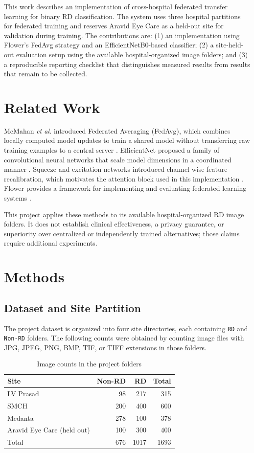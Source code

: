 \documentclass[conference]{IEEEtran}
\begin{document}
This work describes an implementation of cross-hospital federated transfer learning for binary RD classification. The system uses three hospital partitions for federated training and reserves Aravid Eye Care as a held-out site for validation during training. The contributions are: (1) an implementation using Flower's FedAvg strategy and an EfficientNetB0-based classifier; (2) a site-held-out evaluation setup using the available hospital-organized image folders; and (3) a reproducible reporting checklist that distinguishes measured results from results that remain to be collected.

\section{Related Work}
McMahan \emph{et al.} introduced Federated Averaging (FedAvg), which combines locally computed model updates to train a shared model without transferring raw training examples to a central server \cite{mcmahan2017}. EfficientNet proposed a family of convolutional neural networks that scale model dimensions in a coordinated manner \cite{tan2019}. Squeeze-and-excitation networks introduced channel-wise feature recalibration, which motivates the attention block used in this implementation \cite{hu2018}. Flower provides a framework for implementing and evaluating federated learning systems \cite{beutel2020}.

This project applies these methods to its available hospital-organized RD image folders. It does not establish clinical effectiveness, a privacy guarantee, or superiority over centralized or independently trained alternatives; those claims require additional experiments.

\section{Methods}
\subsection{Dataset and Site Partition}
The project dataset is organized into four site directories, each containing \texttt{RD} and \texttt{Non-RD} folders. The following counts were obtained by counting image files with JPG, JPEG, PNG, BMP, TIF, or TIFF extensions in those folders.

\begin{table}[htbp]
\caption{Image counts in the project folders}
\label{tab:counts}
\centering
\begin{tabular}{lrrr}
\toprule
\textbf{Site} & \textbf{Non-RD} & \textbf{RD} & \textbf{Total}\\
\midrule
LV Prasad & 98 & 217 & 315\\
SMCH & 200 & 400 & 600\\
Medanta & 278 & 100 & 378\\
Aravid Eye Care (held out) & 100 & 300 & 400\\
\midrule
Total & 676 & 1017 & 1693\\
\bottomrule
\end{tabular}
\end{table}
\end{document}
